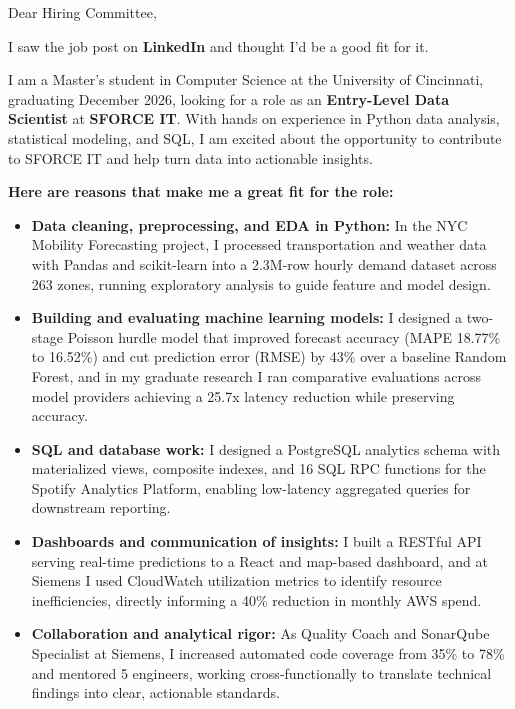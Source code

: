 \documentclass[11pt]{letter}
\date{}
\begin{document}
\begin{letter}{}

\opening{Dear Hiring Committee,}

I saw the job post on \textbf{LinkedIn} and thought I'd be a good fit for it.

I am a Master's student in Computer Science at the University of Cincinnati, graduating December 2026, looking for a role as an \textbf{Entry-Level Data Scientist} at \textbf{SFORCE IT}. With hands on experience in Python data analysis, statistical modeling, and SQL, I am excited about the opportunity to contribute to SFORCE IT and help turn data into actionable insights.

\textbf{Here are reasons that make me a great fit for the role:}

\begin{itemize}[leftmargin=*, itemsep=0.45em]
    \item \textbf{Data cleaning, preprocessing, and EDA in Python:} In the NYC Mobility Forecasting project, I processed transportation and weather data with Pandas and scikit-learn into a 2.3M-row hourly demand dataset across 263 zones, running exploratory analysis to guide feature and model design.

    \item \textbf{Building and evaluating machine learning models:} I designed a two-stage Poisson hurdle model that improved forecast accuracy (MAPE 18.77\% to 16.52\%) and cut prediction error (RMSE) by 43\% over a baseline Random Forest, and in my graduate research I ran comparative evaluations across model providers achieving a 25.7x latency reduction while preserving accuracy.

    \item \textbf{SQL and database work:} I designed a PostgreSQL analytics schema with materialized views, composite indexes, and 16 SQL RPC functions for the Spotify Analytics Platform, enabling low-latency aggregated queries for downstream reporting.

    \item \textbf{Dashboards and communication of insights:} I built a RESTful API serving real-time predictions to a React and map-based dashboard, and at Siemens I used CloudWatch utilization metrics to identify resource inefficiencies, directly informing a 40\% reduction in monthly AWS spend.

    \item \textbf{Collaboration and analytical rigor:} As Quality Coach and SonarQube Specialist at Siemens, I increased automated code coverage from 35\% to 78\% and mentored 5 engineers, working cross-functionally to translate technical findings into clear, actionable standards.
\end{itemize}


\end{letter}
\end{document}
